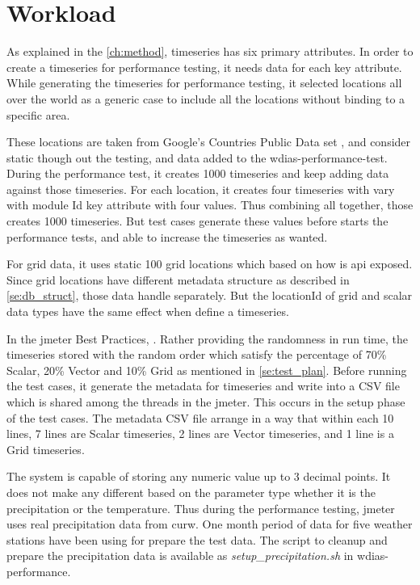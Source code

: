 \section{Workload}

As explained in the \ref{ch:method}, timeseries has six primary attributes. In order to create a timeseries for performance testing, it needs data for each key attribute.
While generating the timeseries for performance testing, it selected locations all over the world as a generic case to include all the locations without binding to a specific area.

These locations are taken from Google's Countries Public Data set \cite{GoogleGoogleCounties}, and consider static though out the testing, and data added to the wdias-performance-test.
During the performance test, it creates 1000 timeseries and keep adding data against those timeseries. For each location, it creates four timeseries with vary with module Id key attribute with four values. Thus combining all together, those creates 1000 timeseries. But test cases generate these values before starts the performance tests, and able to increase the timeseries as wanted.

For grid data, it uses static 100 grid locations which based on how is \acrshort{api} exposed. Since grid locations have different metadata structure as described in \ref{se:db_struct}, those data handle separately. But the locationId of grid and scalar data types have the same effect when define a timeseries.

In the \acrshort{jmeter} Best Practices, . Rather providing the randomness in run time, the timeseries stored with the random order which satisfy the percentage of 70\% Scalar, 20\% Vector and 10\% Grid as mentioned in \ref{se:test_plan}.
Before running the test cases, it generate the metadata for timeseries and write into a CSV file which is shared among the threads in the \acrshort{jmeter}. This occurs in the setup phase of the test cases. The metadata CSV file arrange in a way that within each 10 lines, 7 lines are Scalar timeseries, 2 lines are Vector timeseries, and 1 line is a Grid timeseries.

The system is capable of storing any numeric value up to 3 decimal points. It does not make any different based on the parameter type whether it is the precipitation or the temperature. Thus during the performance testing, \acrshort{jmeter} uses real precipitation data from \acrshort{curw}. One month period of data for five weather stations have been using for prepare the test data. The script to cleanup and prepare the precipitation data is available as \emph{setup\_precipitation.sh} in wdias-performance.

